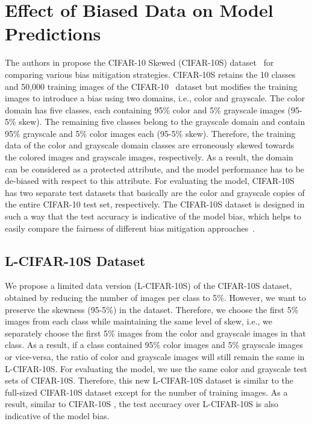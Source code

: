 \documentclass[10pt,twocolumn,letterpaper]{article}
\begin{document}
\section{Effect of Biased Data on Model Predictions}\label{sec:fullstory} %

The authors in \cite{wang2020towards} propose the CIFAR-10 Skewed (CIFAR-10S) dataset~\cite{wang2020towards} for comparing various bias mitigation strategies. CIFAR-10S retains the 10 classes and 50,000 training images of the CIFAR-10~\cite{krizhevsky2009learning} dataset but modifies the training images to introduce a bias using two domains, i.e., color and grayscale. The color domain has five classes, each containing 95\% color and 5\% grayscale images (95-5\% skew). The remaining five classes belong to the grayscale domain and contain 95\% grayscale and 5\% color images each (95-5\% skew). Therefore, the training data of the color and grayscale domain classes are erroneously skewed towards the colored images and grayscale images, respectively. As a result, the domain can be considered as a protected attribute, and the model performance has to be de-biased with respect to this attribute. For evaluating the model, CIFAR-10S has two separate test datasets that basically are the color and grayscale copies of the entire CIFAR-10 test set, respectively. The CIFAR-10S dataset is designed in such a way that the test accuracy is indicative of the model bias, which helps to easily compare the fairness of different bias mitigation approaches~\cite{wang2020towards}. 


\subsection{L-CIFAR-10S Dataset}\label{sec:limiteddata}
We propose a limited data version (L-CIFAR-10S) of the CIFAR-10S dataset, obtained by reducing the number of images per class to 5\%. However, we want to preserve the skewness (95-5\%) in the dataset. Therefore, we choose the first 5\% images from each class while maintaining the same level of skew, i.e., we separately choose the first 5\% images from the color and grayscale images in that class. As a result, if a class contained 95\% color images and 5\% grayscale images or vice-versa, the ratio of color and grayscale images will still remain the same in L-CIFAR-10S. For evaluating the model, we use the same color and grayscale test sets of CIFAR-10S. Therefore, this new L-CIFAR-10S dataset is similar to the full-sized CIFAR-10S dataset except for the number of training images. As a result, similar to CIFAR-10S \cite{wang2020towards}, the test accuracy over L-CIFAR-10S is also indicative of the model bias.
\end{document}
